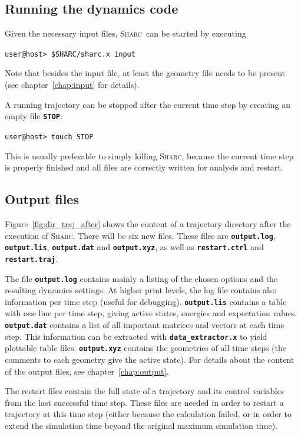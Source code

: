 \documentclass[a4paper,10pt,DIV=15,openany,twoside=false]{scrbook}
\newcommand{\sharc}{\textsc{Sharc}}
\newcommand{\ttt}[1]{\textbf{\texttt{#1}}}
\newenvironment{example}{
  \setlength{\OuterFrameSep}{3pt}
  \vspace{0mm}
  \definecolor{shadecolor}{HTML}{E4F4FF}
  \begin{shaded}
}{
  \end{shaded}
}
\begin{document}
\subsection{Running the dynamics code}

Given the necessary input files, \sharc\ can be started by executing
\begin{example}
\verb|user@host> $SHARC/sharc.x input|
\end{example}
Note that besides the input file, at least the geometry file needs to be present (see chapter~\ref{chap:input} for details).

A running trajectory can be stopped after the current time step by creating an empty file \ttt{STOP}:
\begin{example}
\verb|user@host> touch STOP|
\end{example}
This is usually preferable to simply killing \sharc, because the current time step is properly finished and all files are correctly written for analysis and restart.

\subsection{Output files}

Figure~\ref{fig:dir_traj_after} shows the content of a trajectory directory after the execution of \sharc. There will be six new files. These files are \ttt{output.log}, \ttt{output.lis}, \ttt{output.dat} and \ttt{output.xyz}, as well as \ttt{restart.ctrl} and \ttt{restart.traj}.

The file \ttt{output.log} contains mainly a listing of the chosen options and the resulting dynamics settings. At higher print levels, the log file contains also information per time step (useful for debugging). \ttt{output.lis} contains a table with one line per time step, giving active states, energies and expectation values. \ttt{output.dat} contains a list of all important matrices and vectors at each time step. This information can be extracted with \ttt{data\_extractor.x} to yield plottable table files. \ttt{output.xyz} contains the geometries of all time steps (the comments to each geometry give the active state).
For details about the content of the output files, see chapter~\ref{chap:output}.

The restart files contain the full state of a trajectory and its control variables from the last successful time step. These files are needed in order to restart a trajectory at this time step (either because the calculation failed, or in order to extend the simulation time beyond the original maximum simulation time). 
\end{document}
